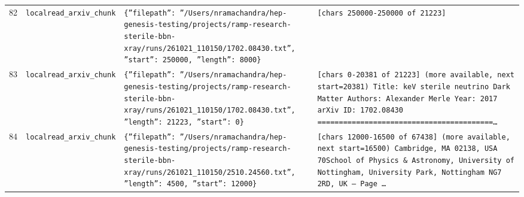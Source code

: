 \documentclass[11pt,a4paper]{article}
\begin{document}
\begin{longtable}{@{}p{}p{}p{}p{}@{}}
82 & \texttt{local}\newline\texttt{read\_\allowbreak{}arxiv\_\allowbreak{}chunk} & \texttt{\{''filepath'':\allowbreak{} ''/\allowbreak{}Users/\allowbreak{}nramachandra/\allowbreak{}hep-genesis-testing/\allowbreak{}projects/\allowbreak{}ramp-research-sterile-bbn-xray/\allowbreak{}runs/\allowbreak{}261021\_\allowbreak{}110150/\allowbreak{}1702.08430.txt'',\allowbreak{} ''start'':\allowbreak{} 250000,\allowbreak{} ''length'':\allowbreak{} 8000\}\allowbreak{}} & \texttt{[chars 250000-250000 of 21223]\allowbreak{}} \\
83 & \texttt{local}\newline\texttt{read\_\allowbreak{}arxiv\_\allowbreak{}chunk} & \texttt{\{''filepath'':\allowbreak{} ''/\allowbreak{}Users/\allowbreak{}nramachandra/\allowbreak{}hep-genesis-testing/\allowbreak{}projects/\allowbreak{}ramp-research-sterile-bbn-xray/\allowbreak{}runs/\allowbreak{}261021\_\allowbreak{}110150/\allowbreak{}1702.08430.txt'',\allowbreak{} ''length'':\allowbreak{} 21223,\allowbreak{} ''start'':\allowbreak{} 0\}\allowbreak{}} & \texttt{[chars 0-20381 of 21223]\allowbreak{} (more available,\allowbreak{} next start=\allowbreak{}20381)\allowbreak{}  Title:\allowbreak{} keV sterile neutrino Dark Matter Authors:\allowbreak{} Alexander Merle Year:\allowbreak{} 2017 arXiv ID:\allowbreak{} 1702.08430  =\allowbreak{}=\allowbreak{}=\allowbreak{}=\allowbreak{}=\allowbreak{}=\allowbreak{}=\allowbreak{}=\allowbreak{}=\allowbreak{}=\allowbreak{}=\allowbreak{}=\allowbreak{}=\allowbreak{}=\allowbreak{}=\allowbreak{}=\allowbreak{}=\allowbreak{}=\allowbreak{}=\allowbreak{}=\allowbreak{}=\allowbreak{}=\allowbreak{}=\allowbreak{}=\allowbreak{}=\allowbreak{}=\allowbreak{}=\allowbreak{}=\allowbreak{}=\allowbreak{}=\allowbreak{}=\allowbreak{}=\allowbreak{}=\allowbreak{}=\allowbreak{}=\allowbreak{}=\allowbreak{}=\allowbreak{}=\allowbreak{}=\allowbreak{}=\allowbreak{}=\allowbreak{}\ldots{}\allowbreak{}} \\
84 & \texttt{local}\newline\texttt{read\_\allowbreak{}arxiv\_\allowbreak{}chunk} & \texttt{\{''filepath'':\allowbreak{} ''/\allowbreak{}Users/\allowbreak{}nramachandra/\allowbreak{}hep-genesis-testing/\allowbreak{}projects/\allowbreak{}ramp-research-sterile-bbn-xray/\allowbreak{}runs/\allowbreak{}261021\_\allowbreak{}110150/\allowbreak{}2510.24560.txt'',\allowbreak{} ''length'':\allowbreak{} 4500,\allowbreak{} ''start'':\allowbreak{} 12000\}\allowbreak{}} & \texttt{[chars 12000-16500 of 67438]\allowbreak{} (more available,\allowbreak{} next start=\allowbreak{}16500)\allowbreak{}   Cambridge,\allowbreak{} MA 02138,\allowbreak{} USA 70School of Physics \& Astronomy,\allowbreak{} University of Nottingham,\allowbreak{} University Park,\allowbreak{} Nottingham NG7 2RD,\allowbreak{} UK  --- Page \ldots{}\allowbreak{}} \\

\end{longtable}
\end{document}
